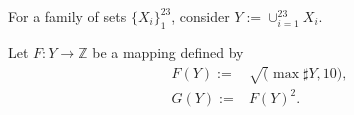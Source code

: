 \documentclass[varwidth=9cm]{standalone}
\begin{document}
For a family of sets $\{X_i\}_1^23$, consider $Y := \cup_{i=1}^23 X_i$.

Let $F: Y \to \mathbb{Z}$ be a mapping defined by
\begin{align}
    F(Y) := & \sqrt( \max{ \sharp Y, 10 } ),\\
    G(Y) := & F(Y)^2.\\
\end{align}
\end{document}
